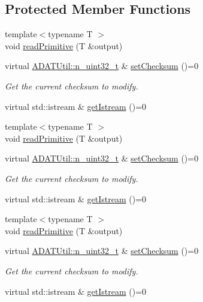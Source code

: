 \subsection*{Protected Member Functions}
\begin{DoxyCompactItemize}
\item 
{\footnotesize template$<$typename T $>$ }\\void \mbox{\hyperlink{classADATIO_1_1BinaryReader_aeb7e739afca615aff19646e64b8da320}{read\+Primitive}} (T \&output)
\item 
virtual \mbox{\hyperlink{namespaceADATUtil_ad945a8afa4db2d1f89b731964adae97e}{A\+D\+A\+T\+Util\+::n\+\_\+uint32\+\_\+t}} \& \mbox{\hyperlink{classADATIO_1_1BinaryReader_a33d291f073bf2e1f71f6bdbe40ce343a}{set\+Checksum}} ()=0
\begin{DoxyCompactList}\small\item\em Get the current checksum to modify. \end{DoxyCompactList}\item 
virtual std\+::istream \& \mbox{\hyperlink{classADATIO_1_1BinaryReader_aa34e73d5f1e6b2b3b48c27e97f6a85a0}{get\+Istream}} ()=0
\item 
{\footnotesize template$<$typename T $>$ }\\void \mbox{\hyperlink{classADATIO_1_1BinaryReader_aeb7e739afca615aff19646e64b8da320}{read\+Primitive}} (T \&output)
\item 
virtual \mbox{\hyperlink{namespaceADATUtil_ad945a8afa4db2d1f89b731964adae97e}{A\+D\+A\+T\+Util\+::n\+\_\+uint32\+\_\+t}} \& \mbox{\hyperlink{classADATIO_1_1BinaryReader_a33d291f073bf2e1f71f6bdbe40ce343a}{set\+Checksum}} ()=0
\begin{DoxyCompactList}\small\item\em Get the current checksum to modify. \end{DoxyCompactList}\item 
virtual std\+::istream \& \mbox{\hyperlink{classADATIO_1_1BinaryReader_aa34e73d5f1e6b2b3b48c27e97f6a85a0}{get\+Istream}} ()=0
\item 
{\footnotesize template$<$typename T $>$ }\\void \mbox{\hyperlink{classADATIO_1_1BinaryReader_aeb7e739afca615aff19646e64b8da320}{read\+Primitive}} (T \&output)
\item 
virtual \mbox{\hyperlink{namespaceADATUtil_ad945a8afa4db2d1f89b731964adae97e}{A\+D\+A\+T\+Util\+::n\+\_\+uint32\+\_\+t}} \& \mbox{\hyperlink{classADATIO_1_1BinaryReader_a33d291f073bf2e1f71f6bdbe40ce343a}{set\+Checksum}} ()=0
\begin{DoxyCompactList}\small\item\em Get the current checksum to modify. \end{DoxyCompactList}\item 
virtual std\+::istream \& \mbox{\hyperlink{classADATIO_1_1BinaryReader_aa34e73d5f1e6b2b3b48c27e97f6a85a0}{get\+Istream}} ()=0
\end{DoxyCompactItemize}



